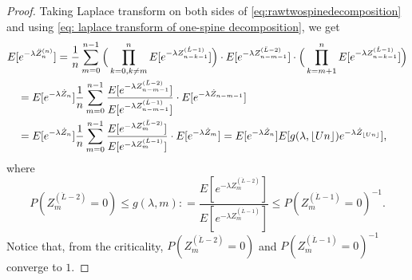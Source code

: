 \documentclass[12pt,a4paper]{amsart}
\DeclarePairedDelimiter\floor{\lfloor}{\rfloor}
\numberwithin{equation}{section}
\begin{document}
\begin{proof}
	Taking Laplace transform on both sides of \eqref{eq:rawtwospinedecomposition}  and using \eqref{eq: laplace transform of one-spine decomposition}, we get
\[  \begin{split}
	&E [ e^{- \lambda \ddot Z_n^{(n)}} ]
	= \frac{1}{n}\sum_{m=0}^{n-1} \Big( \prod_{k=0,k\neq m}^{n} E[e^{-\lambda Z^{(\dot L - 1)}_{n-k-1}}] \Big) \cdot E [e^{-\lambda Z^{(\ddot L - 2)}_{n-m-1}}] \cdot \Big(\prod_{k= m+1}^n E [e^{-\lambda Z^{(\dot L - 1)}_{n-k-1}}]\Big)
	 \\&\quad = E [e^{-\lambda \dot Z_n}]  \frac{1}{n} \sum_{m=0}^{n-1}   \frac{ E [e^{-\lambda Z^{(\ddot L - 2)}_{n-m-1} }] }{ E[e^{-\lambda Z^{(\dot L - 1)}_{n-m-1}  }] } \cdot E[e^{- \lambda \dot Z_{n-m-1}}]
	 \\&\quad = E [e^{-\lambda \dot Z_n}]  \frac{1}{n}\sum_{m=0}^{n-1} \frac{ E [e^{-\lambda Z^{(\ddot L - 2)}_{m}}] }{ E[e^{-\lambda Z^{(\dot L - 1)}_{m}}] } \cdot E[e^{- \lambda \dot Z_{m}}]
	= E [e^{-\lambda \dot Z_n}] E[g(\lambda,\floor{Un})e^{-\lambda \dot Z_{\floor{Un}}}],
\end{split}
\]
	where
\[
	P( Z^{(\ddot L - 2)}_m=0 )
	\leq	g(\lambda,m)
	: = \frac{ E [e^{-\lambda Z^{(\ddot L - 2)}_{m}}] }{ E[e^{-\lambda Z^{(\dot L - 1)}_{m}}] }
	\leq P ( Z^{(\dot L - 1)}_m = 0 )^{-1}.
\]
	Notice that, from the criticality, $P (  Z^{(\ddot L - 2)}_m=0 )$ and $P ( Z^{(\dot L - 1)}_m = 0 )^{-1}$ converge to $1$.
\end{proof}
\end{document}
